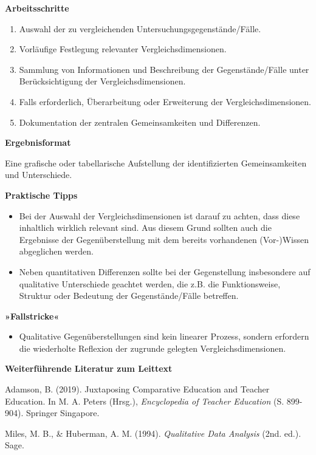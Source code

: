 \documentclass[
  a4paper,
]{book}
\providecommand{\tightlist}{%
  \setlength{\itemsep}{0pt}\setlength{\parskip}{0pt}}
\begin{document}
\textbf{Arbeitsschritte}

\begin{enumerate}
\def\labelenumi{\arabic{enumi}.}
\tightlist
\item
  Auswahl der zu vergleichenden Untersuchungsgegenstände/Fälle.
\item
  Vorläufige Festlegung relevanter Vergleichsdimensionen.
\item
  Sammlung von Informationen und Beschreibung der Gegenstände/Fälle unter Berücksichtigung der Vergleichsdimensionen.
\item
  Falls erforderlich, Überarbeitung oder Erweiterung der Vergleichsdimensionen.
\item
  Dokumentation der zentralen Gemeinsamkeiten und Differenzen.
\end{enumerate}

\textbf{Ergebnisformat}

Eine grafische oder tabellarische Aufstellung der identifizierten Gemeinsamkeiten und Unterschiede.

\textbf{Praktische Tipps}

\begin{itemize}
\tightlist
\item
  Bei der Auswahl der Vergleichsdimensionen ist darauf zu achten, dass diese inhaltlich wirklich relevant sind. Aus diesem Grund sollten auch die Ergebnisse der Gegenüberstellung mit dem bereits vorhandenen (Vor-)Wissen abgeglichen werden.
\item
  Neben quantitativen Differenzen sollte bei der Gegenstellung insbesondere auf qualitative Unterschiede geachtet werden, die z.B. die Funktionsweise, Struktur oder Bedeutung der Gegenstände/Fälle betreffen.
\end{itemize}

\textbf{»Fallstricke«}

\begin{itemize}
\tightlist
\item
  Qualitative Gegenüberstellungen sind kein linearer Prozess, sondern erfordern die wiederholte Reflexion der zugrunde gelegten Vergleichsdimensionen.
\end{itemize}

\textbf{Weiterführende Literatur zum Leittext}

Adamson, B. (2019). Juxtaposing Comparative Education and Teacher Education. In M. A. Peters (Hrsg.), \emph{Encyclopedia of Teacher Education} (S. 899-904). Springer Singapore.

Miles, M. B., \& Huberman, A. M. (1994). \emph{Qualitative Data Analysis} (2nd. ed.). Sage.
\end{document}
